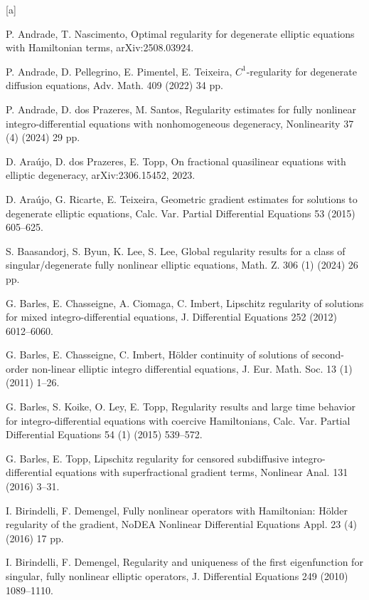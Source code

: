 \documentclass[11pt,reqno]{amsart}
\numberwithin{equation}{section}
\begin{document}
\begin{thebibliography}{[a]}

 P. Andrade, T. Nascimento, Optimal regularity for degenerate elliptic equations with Hamiltonian terms, arXiv:2508.03924.

 P. Andrade, D. Pellegrino, E. Pimentel, E. Teixeira, $C^1$-regularity for degenerate diffusion equations, Adv. Math. 409 (2022) 34 pp.

 P. Andrade, D. dos Prazeres, M. Santos, Regularity estimates for fully nonlinear integro-differential equations with nonhomogeneous degeneracy, Nonlinearity 37 (4) (2024) 29 pp.

 D. Ara\'{u}jo, D. dos Prazeres, E. Topp, On fractional quasilinear equations with elliptic degeneracy, arXiv:2306.15452, 2023.

 D. Ara\'{u}jo, G. Ricarte, E. Teixeira, Geometric gradient estimates for solutions to degenerate elliptic equations, Calc. Var. Partial Differential Equations 53 (2015) 605--625.
        

 S. Baasandorj, S. Byun, K. Lee, S. Lee, Global regularity results for a class of singular/degenerate fully nonlinear elliptic equations, Math. Z. 306 (1) (2024) 26 pp.


 G. Barles, E. Chasseigne, A. Ciomaga, C. Imbert, Lipschitz regularity of solutions for mixed integro-differential equations, J. Differential Equations 252 (2012) 6012--6060.

 G. Barles, E. Chasseigne, C. Imbert, H\"{o}lder continuity of solutions of second-order non-linear elliptic integro differential equations, J. Eur. Math. Soc. 13 (1) (2011) 1--26.

 G. Barles, S. Koike, O. Ley, E. Topp, Regularity results and large time behavior for integro-differential equations with coercive Hamiltonians, Calc. Var. Partial Differential Equations 54 (1) (2015) 539--572.

 G. Barles, E. Topp, Lipschitz regularity for censored subdiffusive integro-differential equations with superfractional gradient terms, Nonlinear Anal. 131 (2016) 3--31.

 I. Birindelli, F. Demengel, Fully nonlinear operators with Hamiltonian: H\"{o}lder regularity of the gradient, NoDEA Nonlinear Differential Equations Appl. 23 (4) (2016) 17 pp.

 I. Birindelli, F. Demengel, Regularity and uniqueness of the first eigenfunction for singular, fully nonlinear elliptic operators, J. Differential Equations 249 (2010) 1089--1110.


\end{thebibliography}
\end{document}

